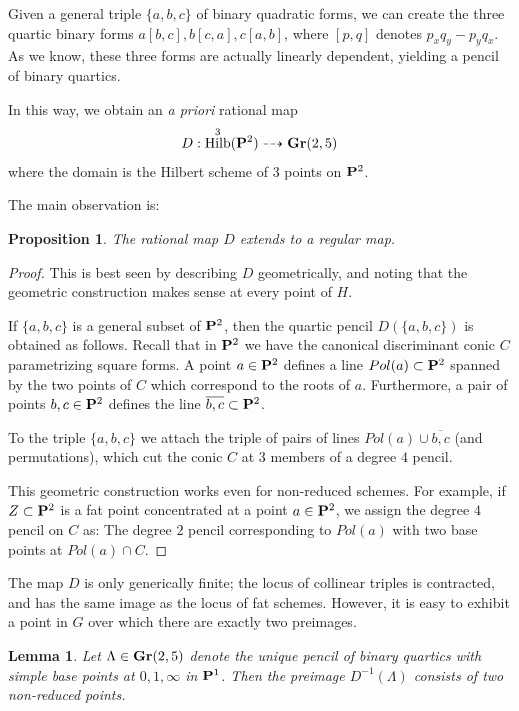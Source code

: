 \documentclass[11pt,reqno]{amsart}
\theoremstyle{plain}
\newtheorem{proposition}[theorem]{Proposition}
\newtheorem{lemma}[theorem]{Lemma}
\theoremstyle{definition}
\theoremstyle{remark}
\numberwithin{equation}{section}
\DeclareMathOperator{\Hilb}{Hilb}
\numberwithin{equation}{section}
\begin{document}
Given a general triple $\{a,b,c\}$ of binary quadratic forms, we can create the three quartic binary forms $a[b,c], b[c,a], c[a,b]$, where $[p,q]$ denotes $p_{x}q_{y} - p_{y}q_{x}$.  As we know, these three forms are actually linearly dependent, yielding a pencil of binary quartics. 

In this way, we obtain an {\sl a priori} rational map
\begin{align*}
 	D: \Hilb^{3}(\P^{2}) \dashrightarrow \Gr(2,5)
 \end{align*} 
 where the domain is the Hilbert scheme of $3$ points on $\P^{2}$. 

 The main observation is: 
 \begin{proposition}
 	\label{proposition:Dregular}
 	The rational map $D$ extends to a regular map.
 \end{proposition}

 \begin{proof}
 	This is best seen by describing $D$ geometrically, and noting that the geometric construction makes sense at every point of $H$.

 	If $\{a,b,c\}$ is a general subset of $\P^{2}$, then the quartic pencil $D(\{a,b,c\})$ is obtained as follows.  Recall that in $\P^{2}$ we have the canonical discriminant conic $C$ parametrizing square forms. A point $a \in \P^{2}$ defines a line $Pol(a) \subset \P^{2}$ spanned by the two points of $C$ which correspond to the roots of $a$. Furthermore, a pair of points $b,c \in \P^{2}$ defines the line $\overline{b,c} \subset \P^{2}$. 

 	To the triple $\{a,b,c\}$ we attach the triple of pairs of lines $Pol(a) \cup \overline{b,c}$ (and permutations), which cut the conic $C$ at $3$ members of a degree $4$ pencil. 

 	This geometric construction works even for non-reduced schemes.  For example, if $Z \subset \P^{2}$ is a fat point concentrated at a point $a \in \P^{2}$, we assign the degree $4$ pencil on $C$ as: The degree $2$ pencil corresponding to $Pol(a)$ with two base points at $Pol(a) \cap C$.
 \end{proof}

 The map $D$ is only generically finite; the locus of collinear triples is contracted, and has the same image as the locus of fat schemes.   However, it is easy to exhibit a point in $G$ over which there are exactly two preimages. 

 \begin{lemma}
 	\label{lemma:TwoPreimages}
 	Let $\Lambda \in \Gr(2,5)$ denote the unique pencil of binary quartics with simple base points at $0,1,\infty$ in $\P^{1}$. Then the preimage $D^{-1}(\Lambda)$ consists of two non-reduced points.
 \end{lemma}
\end{document}
